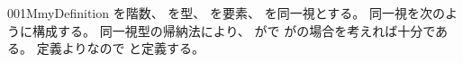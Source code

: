 \documentclass[index]{subfiles}
\begin{document}
\begin{myBlock}{001M}{myDefinition}
  を階数、
  を型、
  を要素、
  を同一視とする。
  同一視を次のように構成する。
  同一視型の帰納法により、
  がで
  がの場合を考えれば十分である。
  定義よりなので
  と定義する。
\end{myBlock}
\end{document}
